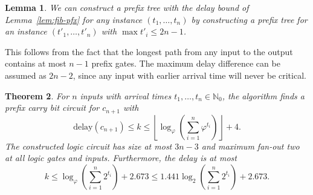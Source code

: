 \documentclass[11pt,final,microtype]{scrartcl}
\theoremstyle{plain}
\newtheorem{theorem}{Theorem}[section]
\newtheorem{lemma}[theorem]{Lemma}
\theoremstyle{definition}
\theoremstyle{remark}
\newcommand{\ld}{\log_{2}}
\newcommand{\loq}{\log_{\varphi}}
\newcommand{\delay}{\mathrm{delay}}
\newcommand{\floor}[1]{\left\lfloor #1 \right\rfloor}
\begin{document}
\begin{lemma} \label{lem:reduction}
  We can construct a prefix tree with the delay bound of
  Lemma~\ref{lem:fib-pfx} for any instance $(t_1, \dots, t_n)$ by
  constructing a prefix tree for an instance $(t'_1, \dots, t'_n)$
  with $\max t'_i \leq 2n - 1 $.
\end{lemma}
This follows from the fact that the longest path from any input to the
output contains at most $n-1$ prefix gates. The maximum delay
difference can be assumed as $2n-2$, since any input with earlier
arrival time will never be critical.

\begin{theorem} \label{thm:my-pfx} For $n$ inputs with arrival times
    $t_1, \dots, t_n \in \mathbb{N}_0$, the algorithm finds a prefix
    carry bit circuit for $c_{n+1}$ with $$\delay(c_{n+1}) \leq k \leq
    \floor{\loq \left(\sum_{i=1}^{n} \varphi^{t_i}\right)} + 4.$$ 
    The constructed logic circuit has size at most $3n - 3$ and
    maximum fan-out two at all logic gates and inputs. Furthermore,
    the delay is at most
    $$k \leq \loq \left(\sum_{i=1}^n 2^{t_i}\right) + 2.673 \leq 1.441 \ld
    \left(\sum_{i=1}^n 2^{t_i}\right) + 2.673.$$
  \end{theorem}
\end{document}
